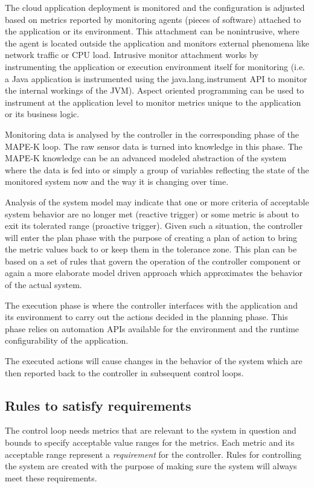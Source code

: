 \documentclass[english]{tktltiki2}
\theoremstyle{definition}
\theoremstyle{remark}
\begin{document}
The cloud application deployment is monitored and the configuration is adjusted
based on metrics reported by monitoring agents (pieces of software) attached to
the application or its environment. This attachment can be nonintrusive, where
the agent is located outside the application and monitors external phenomena
like network traffic or CPU load. Intrusive monitor attachment works by
instrumenting the application or execution environment itself for monitoring
(i.e. a Java application is instrumented using the java.lang.instrument API to
monitor the internal workings of the JVM). Aspect oriented programming can be
used to instrument at the application level to monitor metrics unique to the
application or its business logic.


Monitoring data is analysed by the controller in the corresponding phase of the
MAPE-K loop. The raw sensor data is turned into knowledge in this phase. The
MAPE-K knowledge can be an advanced modeled abstraction of the system where the
data is fed into or simply a group of variables reflecting the state of the
monitored system now and the way it is changing over time.

Analysis of the system model may indicate that one or more criteria of
acceptable system behavior are no longer met (reactive trigger) or some metric
is about to exit its tolerated range (proactive trigger). Given such a
situation, the controller will enter the plan phase with the purpose of creating
a plan of action to bring the metric values back to or keep them in the
tolerance zone. This plan can be based on a set of rules that govern the
operation of the controller component or again a more elaborate model driven
approach which approximates the behavior of the actual system.

The execution phase is where the controller interfaces with the application and
its environment to carry out the actions decided in the planning phase. This
phase relies on automation APIs available for the environment and the runtime
configurability of the application.

The executed actions will cause changes in the behavior of the system which are
then reported back to the controller in subsequent control loops.

\subsection{Rules to satisfy requirements} The control loop needs metrics that
are relevant to the system in question and bounds to specify acceptable value
ranges for the metrics. Each metric and its acceptable range represent a
\emph{requirement} for the controller. Rules for controlling the system are
created with the purpose of making sure the system will always meet these
requirements.
\end{document}

